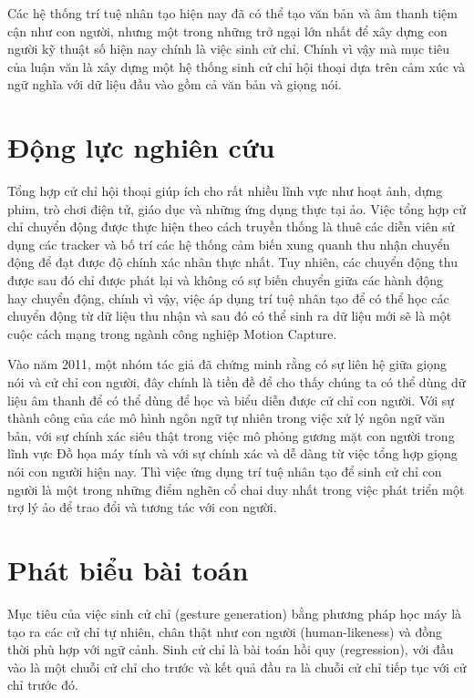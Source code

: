 Các hệ thống trí tuệ nhân tạo hiện nay đã có thể tạo văn bản và âm thanh tiệm cận như con người, nhưng một trong những trở ngại lớn nhất để xây dựng con người kỹ thuật số hiện nay chính là việc sinh cử chỉ. Chính vì vậy mà mục tiêu của luận văn là xây dựng một hệ thống sinh cử chỉ hội thoại dựa trên cảm xúc và ngữ nghĩa với dữ liệu đầu vào gồm cả văn bản và giọng nói.

\section{Động lực nghiên cứu}

Tổng hợp cử chỉ hội thoại giúp ích cho rất nhiều lĩnh vực như hoạt ảnh, dựng phim, trò chơi điện tử, giáo dục và những ứng dụng thực tại ảo. Việc tổng hợp cử chỉ chuyển động được thực hiện theo cách truyền thống là thuê các diễn viên sử dụng các tracker và bố trí các hệ thống cảm biến xung quanh thu nhận chuyển động để đạt được độ chính xác nhân thực nhất. Tuy nhiên, các chuyển động thu được sau đó chỉ được phát lại và không có sự biến chuyển giữa các hành động hay chuyển động, chính vì vậy, việc áp dụng trí tuệ nhân tạo để có thể học các chuyển động từ dữ liệu thu nhận và sau đó có thể sinh ra dữ liệu mới sẽ là một cuộc cách mạng trong ngành công nghiệp Motion Capture.

Vào năm 2011, một nhóm tác giả \cite{bergmann2011relation} đã chứng minh rằng có sự liên hệ giữa giọng nói và cử chỉ con người, đây chính là tiền đề để cho thấy chúng ta có thể dùng dữ liệu âm thanh để có thể dùng để học và biểu diễn được cử chỉ con người.
Với sự thành công của các mô hình ngôn ngữ tự nhiên trong việc xử lý ngôn ngữ văn bản, với sự chính xác siêu thật trong việc mô phỏng gương mặt con người trong lĩnh vực Đồ họa máy tính và với sự chính xác và dễ dàng từ việc tổng hợp giọng nói con người hiện nay. Thì việc ứng dụng trí tuệ nhân tạo để sinh cử chỉ con người là một trong những điểm nghẽn cổ chai duy nhất trong việc phát triển một trợ lý ảo để trao đổi và tương tác với con người.

\section{Phát biểu bài toán}

Mục tiêu của việc sinh cử chỉ (gesture generation) bằng phương pháp học máy là tạo ra các cử chỉ tự nhiên, chân thật như con người (human-likeness) và đồng thời phù hợp với ngữ cảnh.
Sinh cử chỉ là bài toán hồi quy (regression), với đầu vào là một chuỗi cử chỉ cho trước và kết quả đầu ra là chuỗi cử chỉ tiếp tục với cử chỉ trước đó.


